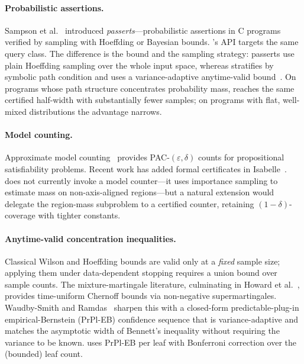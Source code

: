 \paragraph{Probabilistic assertions.}
Sampson et al.~\cite{sampson2014passert} introduced
\emph{passerts}---probabilistic assertions in C programs verified by
sampling with Hoeffding or Bayesian bounds.  \toolname{}'s
 API targets the same query class.  The
difference is the bound and the sampling strategy: passerts use plain
Hoeffding sampling over the whole input space, whereas \toolname{}
stratifies by symbolic path condition and uses a variance-adaptive
anytime-valid bound~\cite{waudbysmith2024betting}.  On programs whose
path structure concentrates probability mass, \toolname{} reaches the
same certified half-width with substantially fewer samples; on
programs with flat, well-mixed distributions the advantage narrows.

\paragraph{Model counting.}
Approximate model counting~\cite{chakraborty2013approxmc,yang2023approxmc6}
provides PAC-$(\varepsilon,\delta)$ counts for propositional
satisfiability problems.  Recent work has added formal certificates
in Isabelle~\cite{kiesl2024certified}.  \toolname{} does not currently
invoke a model counter---it uses importance sampling to estimate mass
on non-axis-aligned regions---but a natural extension would delegate
the region-mass subproblem to a certified counter, retaining
$(1-\delta)$-coverage with tighter constants.

\paragraph{Anytime-valid concentration inequalities.}
Classical Wilson and Hoeffding bounds are valid only at a
\emph{fixed} sample size; applying them under data-dependent stopping
requires a union bound over sample counts.  The mixture-martingale
literature, culminating in Howard et al.~\cite{howard2021time},
provides time-uniform Chernoff bounds via non-negative
supermartingales.  Waudby-Smith and
Ramdas~\cite{waudbysmith2024betting} sharpen this with a closed-form
predictable-plug-in empirical-Bernstein (PrPl-EB) confidence sequence
that is variance-adaptive and matches the asymptotic width of
Bennett's inequality without requiring the variance to be known.
\toolname{} uses PrPl-EB per leaf with Bonferroni correction over the
(bounded) leaf count.

